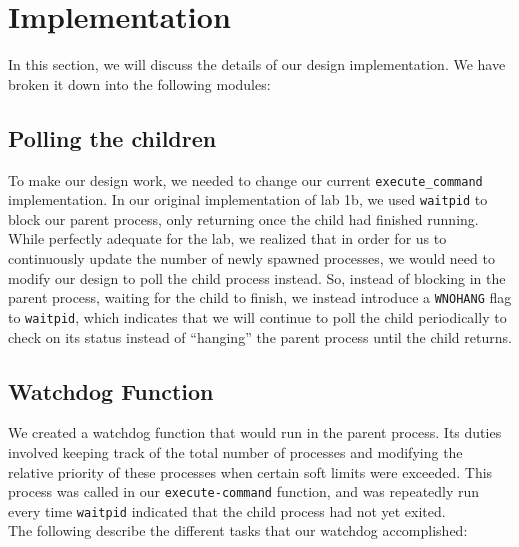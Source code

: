 \documentclass{article}
\begin{document}


\section{Implementation}
In this section, we will discuss the details of our design implementation. We
have broken it down into the following modules:
\subsection{Polling the children}
To make our design work, we needed to change our current \verb+execute_command+
implementation. In our original implementation of lab 1b, we used 
\verb+waitpid+ to block our parent process, only returning once the child had
finished running. While perfectly adequate for the lab, we realized that in 
order for us to continuously update the number of newly spawned processes, we
would need to modify our design to poll the child process instead. So, instead 
of blocking in the parent process, waiting for the child to finish, we instead 
introduce a \verb+WNOHANG+ flag to \verb+waitpid+, which indicates that we 
will continue to poll the child periodically to check on its status instead of
``hanging'' the parent process until the child returns. \\

\subsection{Watchdog Function}
We created a watchdog function that would run in the parent process. Its duties
involved keeping track of the total number of processes and modifying the 
relative priority of these processes when certain soft limits were exceeded. 
This process was called in our \verb+execute-command+ function, and was
repeatedly run every time \verb+waitpid+ indicated that the child process had
not yet exited. \\
The following describe the different tasks that our watchdog accomplished:
\end{document}
